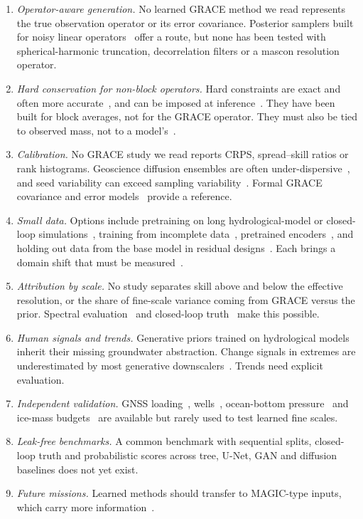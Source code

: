 \begin{enumerate}
  \item \emph{Operator-aware generation.} No learned GRACE method we read represents the true observation operator or its error covariance. Posterior samplers built for noisy linear operators~\cite{kawar2022ddrm,song2023pigdm,chung2023dps,tie2026zssd} offer a route, but none has been tested with spherical-harmonic truncation, decorrelation filters or a mascon resolution operator.
  \item \emph{Hard conservation for non-block operators.} Hard constraints are exact and often more accurate~\cite{harder2023hard}, and can be imposed at inference~\cite{bochow2026smb,christopher2024projected,cheng2025eci}. They have been built for block averages, not for the GRACE operator. They must also be tied to observed mass, not to a model's~\cite{hess2022pcgan}.
  \item \emph{Calibration.} No GRACE study we read reports CRPS, spread--skill ratios or rank histograms. Geoscience diffusion ensembles are often under-dispersive~\cite{mardani2025corrdiff,lopezgomez2025r2d2}, and seed variability can exceed sampling variability~\cite{singh2026intercomparison}. Formal GRACE covariance and error models~\cite{wahr2006accuracy,boergens2020covariance,loomis2019regularization,vandijk2014reanalysis} provide a reference.
  \item \emph{Small data.} Options include pretraining on long hydrological-model or closed-loop simulations~\cite{dobslaw2015esa_esm}, training from incomplete data~\cite{barth2024dindiff}, pretrained encoders~\cite{ribeiro2026prithvi}, and holding out data from the base model in residual designs~\cite{couairon2024arches}. Each brings a domain shift that must be measured~\cite{tie2026zssd}.
  \item \emph{Attribution by scale.} No study separates skill above and below the effective resolution, or the share of fine-scale variance coming from GRACE versus the prior. Spectral evaluation~\cite{lippe2023pderefiner,mardani2025corrdiff} and closed-loop truth~\cite{goracci2026nggm} make this possible.
  \item \emph{Human signals and trends.} Generative priors trained on hydrological models inherit their missing groundwater abstraction. Change signals in extremes are underestimated by most generative downscalers~\cite{rampal2025intercomparison}. Trends need explicit evaluation.
  \item \emph{Independent validation.} GNSS loading~\cite{carlson2022gnss_grace,wei2025cnn_gnss_loading}, wells~\cite{pascal2022evaluating,suryawanshi2026efficacy}, ocean-bottom pressure~\cite{chambers2012obp} and ice-mass budgets~\cite{velicogna2020continuity} are available but rarely used to test learned fine scales.
  \item \emph{Leak-free benchmarks.} A common benchmark with sequential splits, closed-loop truth and probabilistic scores across tree, U-Net, GAN and diffusion baselines does not yet exist.
  \item \emph{Future missions.} Learned methods should transfer to MAGIC-type inputs, which carry more information~\cite{goracci2026nggm,pfeffer2026nggm}.
\end{enumerate}

